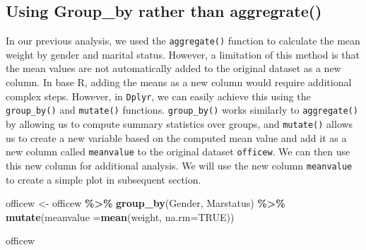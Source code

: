 \documentclass[
]{article}
\newenvironment{Shaded}{\begin{snugshade}}{\end{snugshade}}
\newcommand{\AttributeTok}[1]{\textcolor[rgb]{0.13,0.29,0.53}{#1}}
\newcommand{\ConstantTok}[1]{\textcolor[rgb]{0.56,0.35,0.01}{#1}}
\newcommand{\FunctionTok}[1]{\textcolor[rgb]{0.13,0.29,0.53}{\textbf{#1}}}
\newcommand{\NormalTok}[1]{#1}
\newcommand{\OtherTok}[1]{\textcolor[rgb]{0.56,0.35,0.01}{#1}}
\newcommand{\SpecialCharTok}[1]{\textcolor[rgb]{0.81,0.36,0.00}{\textbf{#1}}}
\begin{document}
\hypertarget{using-group_by-rather-than-aggregrate}{%
\subsection{Using Group\_by rather than
aggregrate()}\label{using-group_by-rather-than-aggregrate}}

In our previous analysis, we used the \texttt{aggregate()} function to
calculate the mean weight by gender and marital status. However, a
limitation of this method is that the mean values are not automatically
added to the original dataset as a new column. In base R, adding the
means as a new column would require additional complex steps. However,
in \texttt{Dplyr}, we can easily achieve this using the
\texttt{group\_by()} and \texttt{mutate()} functions.
\texttt{group\_by()} works similarly to \texttt{aggregate()} by allowing
us to compute summary statistics over groups, and \texttt{mutate()}
allows us to create a new variable based on the computed mean value and
add it as a new column called \texttt{meanvalue} to the original dataset
\texttt{officew}. We can then use this new column for additional
analysis. We will use the new column \texttt{meanvalue} to create a
simple plot in subsequent section.

\begin{Shaded}
\begin{Highlighting}[]
\NormalTok{officew }\OtherTok{\textless{}{-}}\NormalTok{ officew }\SpecialCharTok{\%\textgreater{}\%} \FunctionTok{group\_by}\NormalTok{(Gender, Marstatus) }\SpecialCharTok{\%\textgreater{}\%} \FunctionTok{mutate}\NormalTok{(}\AttributeTok{meanvalue =}\FunctionTok{mean}\NormalTok{(weight, }\AttributeTok{na.rm=}\ConstantTok{TRUE}\NormalTok{))}

\NormalTok{officew }
\end{Highlighting}
\end{Shaded}
\end{document}
